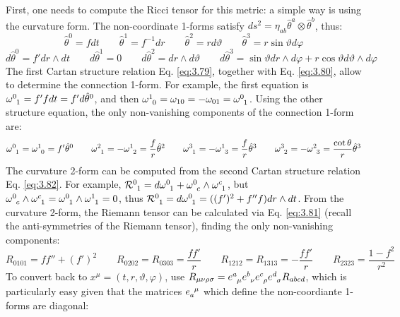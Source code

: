 First, one needs to compute the Ricci tensor for this metric: a simple way is using the curvature form. The non-coordinate 1-forms satisfy $ ds^2 = \eta_{ab} \hat{\theta}^a \otimes \hat{\theta}^b $, thus:
\begin{equation*}
  \hat{\theta}^0 = f dt
  \qquad
  \hat{\theta}^1 = f^{-1} dr
  \qquad
  \hat{\theta}^2 = r d\vartheta
  \qquad
  \hat{\theta}^3 = r \sin \vartheta d\varphi
\end{equation*}
\begin{equation*}
  d\hat{\theta}^0 = f' dr \wedge dt
  \qquad
  d\hat{\theta}^1 = 0
  \qquad
  d\hat{\theta}^2 = dr \wedge d\vartheta
  \qquad
  d\hat{\theta}^3 = \sin \vartheta dr \wedge d\varphi + r \cos \vartheta d\vartheta \wedge d\varphi
\end{equation*}
The first Cartan structure relation Eq. \ref{eq:3.79}, together with Eq. \ref{eq:3.80}, allow to determine the connection 1-form. For example, the first equation is $ \tensor{\omega}{^0_1} = f' f dt = f' d\hat{\theta}^0 $, and then $ \tensor{\omega}{^1_0} = \omega_{10} = - \omega_{01} = \tensor{\omega}{^0_1} $. Using the other structure equation, the only non-vanishing components of the connection 1-form are:
\begin{equation*}
  \tensor{\omega}{^0_1} = \tensor{\omega}{^1_0} = f' \hat{\theta}^0
  \qquad
  \tensor{\omega}{^2_1} = - \tensor{\omega}{^1_2} = \frac{f}{r} \hat{\theta}^2
  \qquad
  \tensor{\omega}{^3_1} = - \tensor{\omega}{^1_3} = \frac{f}{r} \hat{\theta}^3
  \qquad
  \tensor{\omega}{^3_2} = - \tensor{\omega}{^2_3} = \frac{\cot \theta}{r} \hat{\theta}^3
\end{equation*}
The curvature 2-form can be computed from the second Cartan structure relation Eq. \ref{eq:3.82}. For example, $ \tensor{\mathcal{R}}{^0_1} = d\tensor{\omega}{^0_1} + \tensor{\omega}{^0_c} \wedge \tensor{\omega}{^c_1} $, but $ \tensor{\omega}{^0_c} \wedge \tensor{\omega}{^c_1} = \tensor{\omega}{^0_1} \wedge \tensor{\omega}{^1_1} = 0 $, thus $ \tensor{\mathcal{R}}{^0_1} = d\tensor{\omega}{^0_1} = ( (f')^2 + f'' f) dr \wedge dt $. From the curvature 2-form, the Riemann tensor can be calculated via Eq. \ref{eq:3.81} (recall the anti-symmetries of the Riemann tensor), finding the only non-vanishing components:
\begin{equation*}
  R_{0101} = f f'' + (f')^2
  \qquad
  R_{0202} = R_{0303} = \frac{f f'}{r}
  \qquad
  R_{1212} = R_{1313} = - \frac{f f'}{r}
  \qquad
  R_{2323} = \frac{1 - f^2}{r^2}
\end{equation*}
To convert back to $ x^\mu = (t,r,\vartheta,\varphi) $, use $ R_{\mu \nu \rho \sigma} = \tensor{e}{^a_\mu} \tensor{e}{^b_\nu} \tensor{e}{^c_\rho} \tensor{e}{^d_\sigma} R_{abcd} $, which is particularly easy given that the matrices $ \tensor{e}{_a^\mu} $ which define the non-coordiante 1-forms are diagonal:
